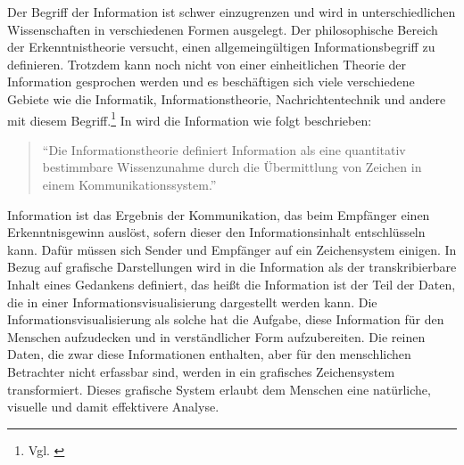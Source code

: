 \documentclass[a4paper, 
               12pt,
               DIV=calc,
               version=first,
               pdftex,
               headsepline,
               footsepline,
               bibtotocnumbered,
               liststotocnumbered]{scrreprt}
\begin{document}
Der Begriff der Information ist schwer einzugrenzen und wird in unterschiedlichen Wissenschaften
in verschiedenen Formen ausgelegt. Der philosophische Bereich der Erkenntnistheorie versucht,
einen allgemeingültigen Informationsbegriff zu definieren. Trotzdem kann noch nicht von einer
einheitlichen Theorie der Information gesprochen werden und es beschäftigen sich viele verschiedene
Gebiete wie die Informatik, Informationstheorie, Nachrichtentechnik und andere mit diesem
Begriff.\footnote{Vgl. \citep{wiki_info}} In \citep[S.\,3]{Hoeher} wird die Information wie folgt beschrieben:
\begin{quote}
"`Die Informationstheorie definiert Information als eine quantitativ bestimmbare Wissenzunahme durch
die Übermittlung von Zeichen in einem Kommunikationssystem."'
\end{quote}
Information ist das Ergebnis der Kommunikation, das beim Empfänger einen Erkenntnisgewinn auslöst,
sofern dieser den Informationsinhalt entschlüsseln kann. Dafür müssen sich Sender und Empfänger
auf ein Zeichensystem einigen.
In Bezug auf grafische Darstellungen wird in \citep{Bertin} die Information als der transkribierbare
Inhalt eines Gedankens definiert, das heißt die Information ist der Teil der Daten, die in einer
Informationsvisualisierung dargestellt werden kann. Die Informationsvisualisierung als solche hat die
Aufgabe, diese Information für den Menschen aufzudecken und in verständlicher Form aufzubereiten.
Die reinen Daten, die zwar diese Informationen enthalten,
aber für den menschlichen Betrachter nicht erfassbar sind, werden in ein grafisches
Zeichensystem transformiert. Dieses grafische System erlaubt dem Menschen eine natürliche, visuelle und
damit effektivere Analyse.
\end{document}
